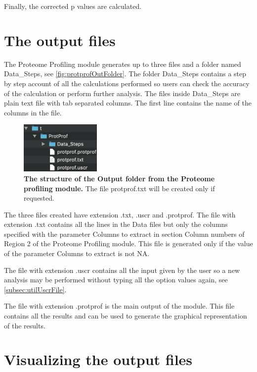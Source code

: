 Finally, the corrected p values are calculated.

\section{The output files}

The Proteome Profiling module generates up to three files and a folder named Data\_Steps, see \autoref{fig:protprofOutFolder}. The folder Data\_Steps contains a step by step account of all the calculations performed so users can check the accuracy of the calculation or perform further analysis. The files inside Data\_Steps are plain text file with tab separated columns. The first line contains the name of the columns in the file.  

\begin{figure}[h]
	\centering
	\includegraphics[width=0.35\textwidth]{./IMAGES/MOD-PROTPROF/protprof-files.jpg}	    
	\caption[The structure of the Output folder from the Proteome Profiling module]{\textbf{The structure of the Output folder from the Proteome profiling module.} The file protprof.txt will be created only if requested.} 
	\label{fig:protprofOutFolder}
	\vspace{-5pt} 	
\end{figure}

The three files created have extension .txt, .uscr and .protprof. The file with extension .txt contains all the lines in the Data files but only the columns specified with the parameter Columns to extract in section Column numbers of Region \num{2} of the Proteome Profiling module. This file is generated only if the value of the parameter Columns to extract is not NA. 

The file with extension .uscr contains all the input given by the user so a new analysis may be performed without typing all the option values again, see \autoref{subsec:utilUscrFile}. 

The file with extension .protprof is the main output of the module. This file contains all the results and can be used to generate the graphical representation of the results.    

\section{Visualizing the output files}

